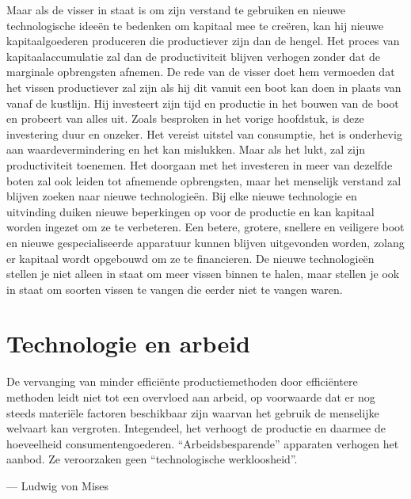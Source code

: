 Maar als de visser in staat is om zijn verstand te gebruiken en nieuwe technologische ideeën te bedenken om kapitaal mee te creëren, kan hij nieuwe kapitaalgoederen produceren die productiever zijn dan de hengel. Het proces van kapitaalaccumulatie zal dan de productiviteit blijven verhogen zonder dat de marginale opbrengsten afnemen. De rede van de visser doet hem vermoeden dat het vissen productiever zal zijn als hij dit vanuit een boot kan doen in plaats van vanaf de kustlijn. Hij investeert zijn tijd en productie in het bouwen van de boot en probeert van alles uit. Zoals besproken in het vorige hoofdstuk, is deze investering duur en onzeker. Het vereist uitstel van consumptie, het is onderhevig aan waardevermindering en het kan mislukken. Maar als het lukt, zal zijn productiviteit toenemen. Het doorgaan met het investeren in meer van dezelfde boten zal ook leiden tot afnemende opbrengsten, maar het menselijk verstand zal blijven zoeken naar nieuwe technologieën. Bij elke nieuwe technologie en uitvinding duiken nieuwe beperkingen op voor de productie en kan kapitaal worden ingezet om ze te verbeteren. Een betere, grotere, snellere en veiligere boot en nieuwe gespecialiseerde apparatuur kunnen blijven uitgevonden worden, zolang er kapitaal wordt opgebouwd om ze te financieren. De nieuwe technologieën stellen je niet alleen in staat om meer vissen binnen te halen, maar stellen je ook in staat om soorten vissen te vangen die eerder niet te vangen waren.


\hypertarget{technologie-en-arbeid}{%
\section{Technologie en arbeid}\label{technologie-en-arbeid}}

\begin{blockquotebox}
    De vervanging van minder efficiënte productiemethoden door efficiëntere methoden leidt niet tot een overvloed aan arbeid, op voorwaarde dat er nog steeds materiële factoren beschikbaar zijn waarvan het gebruik de menselijke welvaart kan vergroten. Integendeel, het verhoogt de productie en daarmee de hoeveelheid consumentengoederen. ``Arbeidsbesparende'' apparaten verhogen het aanbod. Ze veroorzaken geen ``technologische werkloosheid''.\footnotemark
    \par\raggedleft--- Ludwig von Mises
\end{blockquotebox} 
\autocite{72}

